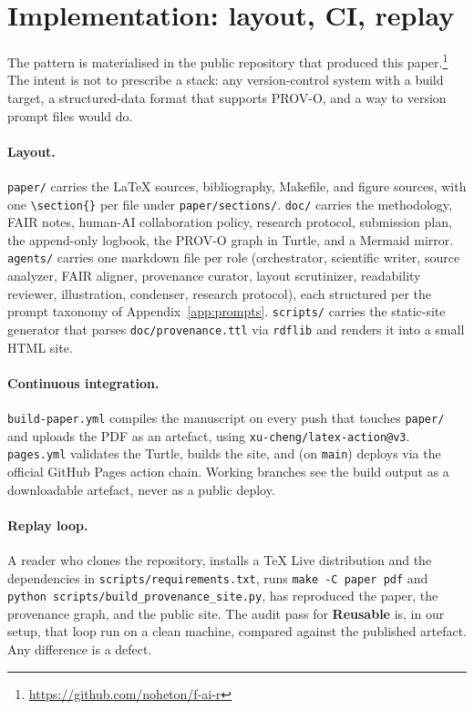 \section{Implementation: layout, CI, replay}
\label{sec:appendix-implementation}

The pattern is materialised in the public repository that produced
this paper.\footnote{\url{https://github.com/noheton/f-ai-r}} The
intent is not to prescribe a stack: any version-control system with
a build target, a structured-data format that supports PROV-O, and a
way to version prompt files would do.

\paragraph{Layout.}
\texttt{paper/} carries the \LaTeX{} sources, bibliography, Makefile,
and figure sources, with one \texttt{\textbackslash section\{\}}
per file under \texttt{paper/sections/}. \texttt{doc/} carries the
methodology, FAIR notes, human-AI collaboration policy, research
protocol, submission plan, the append-only logbook, the PROV-O graph
in Turtle, and a Mermaid mirror. \texttt{agents/} carries one
markdown file per role (orchestrator, scientific writer, source
analyzer, FAIR aligner, provenance curator, layout scrutinizer,
readability reviewer, illustration, condenser, research protocol),
each structured per the prompt taxonomy of
Appendix~\ref{app:prompts}. \texttt{scripts/} carries the static-site
generator that parses \texttt{doc/provenance.ttl} via \texttt{rdflib}
and renders it into a small HTML site.

\paragraph{Continuous integration.}
\texttt{build-paper.yml} compiles the manuscript on every push that
touches \texttt{paper/} and uploads the PDF as an artefact, using
\texttt{xu-cheng/latex-action@v3}. \texttt{pages.yml} validates the
Turtle, builds the site, and (on \texttt{main}) deploys via the
official GitHub Pages action chain. Working branches see the build
output as a downloadable artefact, never as a public deploy.

\paragraph{Replay loop.}
A reader who clones the repository, installs a TeX Live distribution
and the dependencies in \texttt{scripts/requirements.txt}, runs
\texttt{make -C paper pdf} and
\texttt{python scripts/build\_provenance\_site.py}, has reproduced
the paper, the provenance graph, and the public site. The audit pass
for \textbf{Reusable} is, in our setup, that loop run on a clean
machine, compared against the published artefact. Any difference is
a defect.
